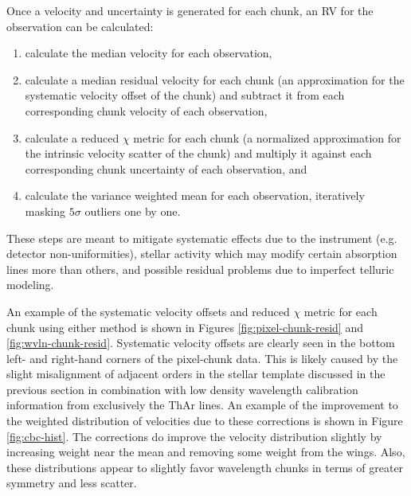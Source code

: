 Once a velocity and uncertainty is generated for each chunk, an RV for the observation can be calculated:
\begin{enumerate}
    \item calculate the median velocity for each observation,
    \item calculate a median residual velocity for each chunk (an approximation for the systematic velocity offset of the chunk) and subtract it from each corresponding chunk velocity of each observation,
    \item calculate a reduced $\chi$ metric for each chunk (a normalized approximation for the intrinsic velocity scatter of the chunk) and multiply it against each corresponding chunk uncertainty of each observation, and
    \item calculate the variance weighted mean for each observation, iteratively masking $5\sigma$ outliers one by one.
\end{enumerate}
These steps are meant to mitigate systematic effects due to the instrument (e.g. detector non-uniformities), stellar activity which may modify certain absorption lines more than others, and possible residual problems due to imperfect telluric modeling.

An example of the systematic velocity offsets and reduced $\chi$ metric for each chunk using either method is shown in Figures \ref{fig:pixel-chunk-resid} and \ref{fig:wvln-chunk-resid}. Systematic velocity offsets are clearly seen in the bottom left- and right-hand corners of the pixel-chunk data. This is likely caused by the slight misalignment of adjacent orders in the stellar template discussed in the previous section in combination with low density wavelength calibration information from exclusively the ThAr lines. An example of the improvement to the weighted distribution of velocities due to these corrections is shown in Figure \ref{fig:cbc-hist}. The corrections do improve the velocity distribution slightly by increasing weight near the mean and removing some weight from the wings. Also, these distributions appear to slightly favor wavelength chunks in terms of greater symmetry and less scatter.

